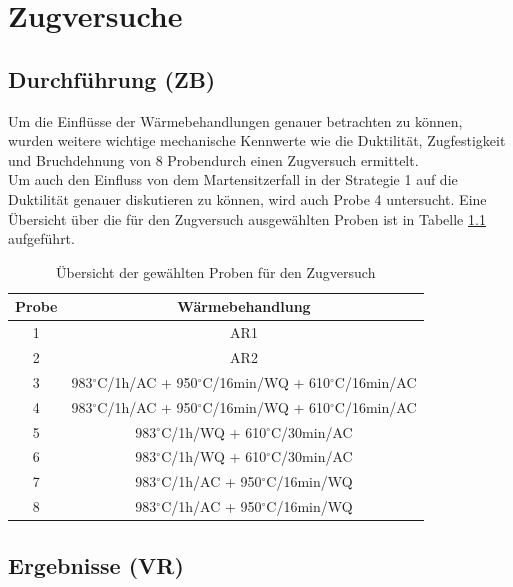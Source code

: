 \chapter{Zugversuche }

\section{Durchführung (ZB)}

Um die Einflüsse der Wärmebehandlungen genauer betrachten zu können, wurden weitere wichtige mechanische Kennwerte wie die Duktilität, Zugfestigkeit und Bruchdehnung von 8 Probendurch einen Zugversuch ermittelt. \\
Um auch den Einfluss von dem Martensitzerfall in der Strategie 1 auf die Duktilität genauer diskutieren zu können, wird auch Probe 4 untersucht. Eine Übersicht über die für den Zugversuch ausgewählten Proben ist in Tabelle \ref{tab:ubersicht} aufgeführt.


\begin{table}[h]
	\centering
	\begin{tabular}{|c|c|}
		\hline 
		Probe & Wärmebehandlung \\ 
		\hline 
		1 & AR1 \\ 
		\hline 
		2 & AR2 \\ 
		\hline 
		3 &  983$^\circ$C/1h/AC + 950$^\circ$C/16min/WQ + 610$^\circ$C/16min/AC \\ 
		\hline 
		4 &  983$^\circ$C/1h/AC + 950$^\circ$C/16min/WQ + 610$^\circ$C/16min/AC \\ 
		\hline 
		5 &  983$^\circ$C/1h/WQ + 610$^\circ$C/30min/AC \\ 
		\hline 
		6 &  983$^\circ$C/1h/WQ + 610$^\circ$C/30min/AC \\ 
		\hline 
		7 &  983$^\circ$C/1h/AC + 950$^\circ$C/16min/WQ \\ 
		\hline 
		8 &  983$^\circ$C/1h/AC + 950$^\circ$C/16min/WQ \\ 
		\hline 
	\end{tabular}
    \caption{Übersicht der gewählten Proben für den Zugversuch}
	\label{tab:ubersicht} 
\end{table}

\section{Ergebnisse (VR)}

